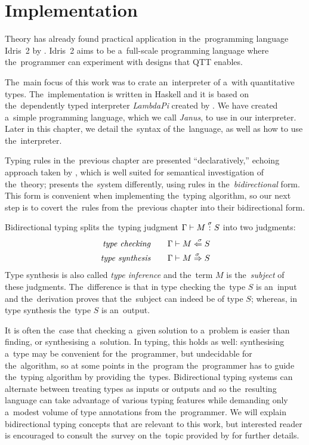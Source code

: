 \chapter{Implementation}\label{cha:implementation}

 Theory has already found practical
application in the~programming language Idris~2 by \citet{brady_2021}. Idris~2
aims to be a~full-scale programming language where the~programmer can experiment
with designs that QTT enables.

The~main focus of this work was to crate an~interpreter of a~\lc with
quantitative types. The~implementation is written in Haskell\citep{haskell_2010}
and it is based on the~dependently typed \lc interpreter \emph{LambdaPi} created
by \citet{loh_et_al_2010}. We have created a~simple programming language, which
we call \emph{Janus}, to use in our interpreter. Later in this chapter, we
detail the~syntax of the~language, as well as how to use the~interpreter.

Typing rules in the~previous chapter are presented ``declaratively,'' echoing
approach taken by \citet{atkey_2018}, which is well suited for semantical
investigation of the~theory; \citet{mcbride_2016} presents the~system
differently, using rules in the~\emph{bidirectional} form. This form is
convenient when implementing the~typing algorithm, so our next step is to covert
the~rules from the~previous chapter into their bidirectional form.

\label{sec:bidir_typing}

Bidirectional typing splits the~typing judgment $\Gamma \vdash M \overset{\sigma}: S$
into two judgments:
\begin{align*}
  \text{\emph{type checking}}\qquad &\Gamma \vdash M \overset{\;\;{\sigma}}{\Leftarrow} S \\
  \text{\emph{type synthesis}}\qquad &\Gamma \vdash M \overset{\!{\sigma}}\Rightarrow S
\end{align*}
Type synthesis is also called \emph{type inference} and the~term $M$ is
the~\emph{subject} of these judgments. The~difference is that in type checking
the~type $S$ is an~input and the~derivation proves that the~subject can indeed
be of type $S$; whereas, in type synthesis the~type $S$ is an~output.

It is often the~case that checking a~given solution to a~problem is easier than
finding, or synthesising a~solution. In typing, this holds as well: synthesising
a~type may be convenient for the~programmer, but undecidable for the~algorithm,
so at some points in the~program the~programmer has to guide the~typing
algorithm by providing the~types. Bidirectional typing systems can alternate
between treating types as inputs or outputs and so the~resulting language can
take advantage of various typing features while demanding only a~modest volume
of type annotations from the~programmer. We will explain bidirectional typing
concepts that are relevant to this work, but interested reader is encouraged to
consult the~survey on the~topic provided by \citet{dunfield_krishnaswami_2019}
for further details.

